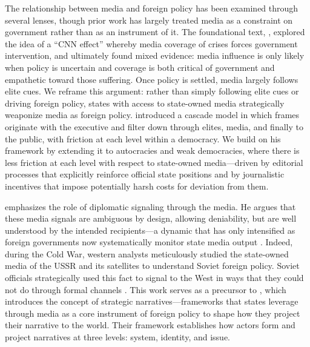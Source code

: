 \documentclass[12pt]{article}
\begin{document}
The relationship between media and foreign policy has been examined through several lenses, though prior work has largely treated media as a constraint on government rather than as an instrument of it. The foundational text, \citet{robinson_cnn_2002}, explored the idea of a ``CNN effect'' whereby media coverage of crises forces government intervention, and ultimately found mixed evidence: media influence is only likely when policy is uncertain and coverage is both critical of government and empathetic toward those suffering. Once policy is settled, media largely follows elite cues. We reframe this argument: rather than simply following elite cues or driving foreign policy, states with access to state-owned media strategically weaponize media as foreign policy. \citet{entman_projections_2004} introduced a cascade model in which frames originate with the executive and filter down through elites, media, and finally to the public, with friction at each level within a democracy. We build on his framework by extending it to autocracies and weak democracies, where there is less friction at each level with respect to state-owned media---driven by editorial processes that explicitly reinforce official state positions and by journalistic incentives that impose potentially harsh costs for deviation from them.

\citet{cohen_theatre_1987} emphasizes the role of diplomatic signaling through the media. He argues that these media signals are ambiguous by design, allowing deniability, but are well understood by the intended recipients---a dynamic that has only intensified as foreign governments now systematically monitor state media output \citep{manor_digitalization_2019, bjola_revisiting_2018, usic_ic_2024}. Indeed, during the Cold War, western analysts meticulously studied the state-owned media of the USSR and its satellites to understand Soviet foreign policy. Soviet officials strategically used this fact to signal to the West in ways that they could not do through formal channels \citep{cohen_theatre_1987}. This work serves as a precursor to \citet{miskimmon_strategic_2013}, which introduces the concept of strategic narratives---frameworks that states leverage through media as a core instrument of foreign policy to shape how they project their narrative to the world. Their framework establishes how actors form and project narratives at three levels: system, identity, and issue.
\end{document}
